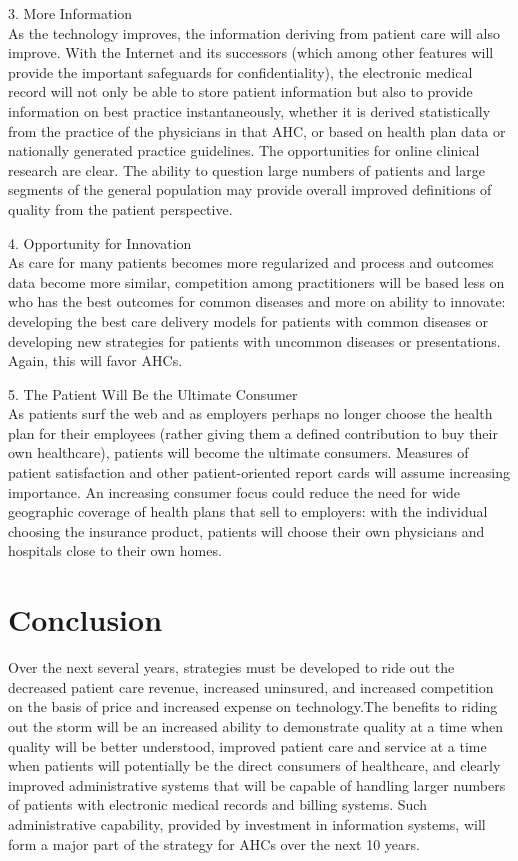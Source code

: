 \documentclass[12pt]{article}
\begin{document}
3. More Information\\
As the technology improves, the information deriving from patient care will also improve. With the Internet and its successors (which among other features will provide the important safeguards for confidentiality), the electronic medical record will not only be able to store patient information but also to provide information on best practice instantaneously, whether it is derived statistically from the practice of the physicians in that AHC, or based on health plan data or nationally generated practice guidelines. The opportunities for online clinical research are clear. The ability to question large numbers of patients and large segments of the general population may provide overall improved definitions of quality from the patient perspective.

4. Opportunity for Innovation\\
As care for many patients becomes more regularized and process and outcomes data become more similar, competition among practitioners will be based less on who has the best outcomes for common diseases and more on ability to innovate: developing the best care delivery models for patients with common diseases or developing new strategies for patients with uncommon diseases or presentations. Again, this will favor AHCs.

5. The Patient Will Be the Ultimate Consumer\\
As patients surf the web and as employers perhaps no longer choose the health plan for their employees (rather giving them a defined contribution to buy their own healthcare), patients will become the ultimate consumers. Measures of patient satisfaction and other patient-oriented report cards will assume increasing importance. An increasing consumer focus could reduce the need for wide geographic coverage of health plans that sell to employers: with the individual choosing the insurance product, patients will choose their own physicians and hospitals close to their own homes.

\section{Conclusion}
Over the next several years, strategies must be developed to ride out the decreased patient care revenue, increased uninsured, and increased competition on the basis of price and increased expense on technology.The benefits to riding out the storm will be an increased ability to demonstrate quality at a time when quality will be better understood, improved patient care and service at a time when patients will potentially be the direct consumers of healthcare, and clearly improved administrative systems that will be capable of handling larger numbers of patients with electronic medical records and billing systems. Such administrative capability, provided by investment in information systems, will form a major part of the strategy for AHCs over the next 10 years.
\end{document}
